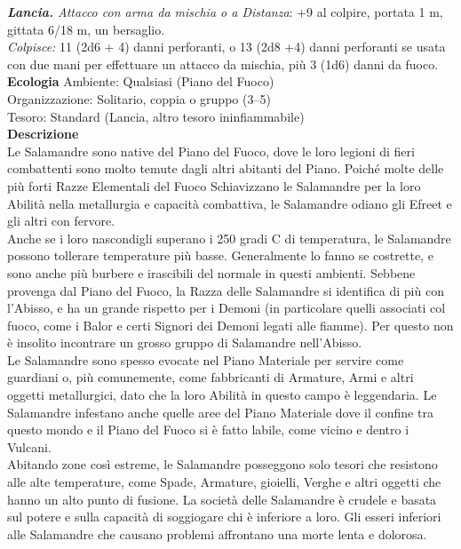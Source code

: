 \begin{multicols}{2}
\emph{\textbf{Lancia.} Attacco con arma da mischia o a Distanza}: +9 al colpire, portata 1 m, gittata 6/18 m, un bersaglio.\\
\emph{Colpisce:} 11 (2d6 + 4) danni perforanti, o 13 (2d8 +4) danni perforanti se usata con due mani per effettuare un attacco da mischia, più 3 (1d6) danni da fuoco.\\
\textbf{Ecologia}
Ambiente: Qualsiasi (Piano del Fuoco)\\
Organizzazione: Solitario, coppia o gruppo (3–5)\\
Tesoro: Standard (Lancia, altro tesoro ininfiammabile)\\
\textbf{Descrizione}\\
Le Salamandre sono native del Piano del Fuoco, dove le loro legioni di fieri combattenti sono molto temute dagli altri abitanti del Piano. Poiché molte delle più forti Razze Elementali del Fuoco Schiavizzano le Salamandre per la loro Abilità nella metallurgia e capacità combattiva, le Salamandre odiano gli Efreet e gli altri con fervore.\\

Anche se i loro nascondigli superano i 250 gradi C di temperatura, le Salamandre possono tollerare temperature più basse. Generalmente lo fanno se costrette, e sono anche più burbere e irascibili del normale in questi ambienti. Sebbene provenga dal Piano del Fuoco, la Razza delle Salamandre si identifica di più con l'Abisso, e ha un grande rispetto per i Demoni (in particolare quelli associati col fuoco, come i Balor e certi Signori dei Demoni legati alle fiamme). Per questo non è insolito incontrare un grosso gruppo di Salamandre nell'Abisso.\\

Le Salamandre sono spesso evocate nel Piano Materiale per servire come guardiani o, più comunemente, come fabbricanti di Armature, Armi e altri oggetti metallurgici, dato che la loro Abilità in questo campo è leggendaria. Le Salamandre infestano anche quelle aree del Piano Materiale dove il confine tra questo mondo e il Piano del Fuoco si è fatto labile, come vicino e dentro i Vulcani.\\

Abitando zone così estreme, le Salamandre posseggono solo tesori che resistono alle alte temperature, come Spade, Armature, gioielli, Verghe e altri oggetti che hanno un alto punto di fusione. La società delle Salamandre è crudele e basata sul potere e sulla capacità di soggiogare chi è inferiore a loro. Gli esseri inferiori alle Salamandre che causano problemi affrontano una morte lenta e dolorosa.\\



\end{multicols}
